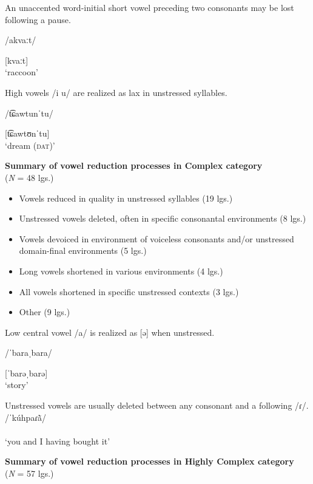 \ea   {}

An unaccented word-initial short vowel preceding two consonants may be lost following a pause.

/akvaːt/

[kvaːt]\\
\glt ‘raccoon’
\citep[53]{Bright1957}

\ex  {}

High vowels /i u/ are realized as lax in unstressed syllables. 

/t͡ɕawtunˈtu/

[t͡ɕawtʊnˈtu]\\
\glt ‘dream (\textsc{dat})’
\citep[35]{Slater2003}
\z
\z

\ea\label{ex:6.18}
  \textbf{Summary of vowel reduction processes in Complex category}\\(\textit{N} = 48 lgs.)

\begin{itemize}
\item Vowels reduced in quality in unstressed syllables (19 lgs.)
\item Unstressed vowels deleted, often in specific consonantal environments (8 lgs.)
\item Vowels devoiced in environment of voiceless consonants and/or unstressed domain-final environments  {(5 lgs.)}
\item Long vowels shortened in various environments  {(4 lgs.)}
\item All vowels shortened in specific unstressed contexts (3 lgs.)
\item Other (9 lgs.)
\end{itemize}

\ea{}

Low central vowel /a/ is realized as [ə] when unstressed.

/ˈbaraˌbara/

[ˈbarəˌbarə]\\
\glt ‘story’
\citep[17--18]{Rumsey1978}

\ex  {}
Unstressed vowels are usually deleted between any consonant and a following /ɾ/.\\
/ˈkúhpaɾ\`{ã}/\\\relax
[ˈkúhpɾ\`{ã}]\\
\glt ‘you and I having bought it’
\citep[23]{Holt1999}
\z
\z

\ea\label{ex:6.19}
  \textbf{Summary of vowel reduction processes in Highly Complex category}\\(\textit{N} = 57 lgs.)

